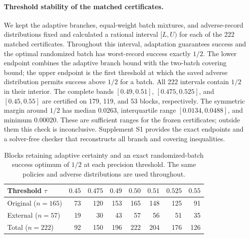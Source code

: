 \paragraph{Threshold stability of the matched certificates.}
We kept the adaptive branches, equal-weight batch mixtures, and adverse-record
distributions fixed and calculated a rational interval $[L,U)$ for each of
the 222 matched certificates. Throughout this interval, adaptation guarantees
success and the optimal randomized batch has worst-record success exactly
$1/2$. The lower endpoint combines the adaptive branch bound with
the two-batch covering bound; the upper endpoint is the first threshold at
which the saved adverse distribution permits success above $1/2$ for a batch.
All 222 intervals contain $1/2$ in their interior. The complete bands
$[0.49,0.51]$, $[0.475,0.525]$, and $[0.45,0.55]$ are certified on 179, 119,
and 53 blocks, respectively. The symmetric margin around $1/2$ has median
$0.0263$, interquartile range $[0.0134,0.0488]$, and minimum $0.00020$.
These are sufficient ranges for the frozen certificates; outside them this
check is inconclusive. Supplement S1 provides the exact endpoints and a
solver-free checker that reconstructs all branch and covering inequalities.

\begin{table}[htbp]
\centering
\small
\caption{Blocks retaining adaptive certainty and an exact randomized-batch
success optimum of $1/2$ at each precision threshold. The same policies and
adverse distributions are used throughout.}
\label{tab:threshold-stability}
\begin{tabular}{lrrrrrrr}
\toprule
Threshold $\tau$ & $0.45$ & $0.475$ & $0.49$ & $0.50$ & $0.51$ & $0.525$ & $0.55$\\
\midrule
Original ($n=165$) & 73 & 120 & 153 & 165 & 148 & 125 & 91\\
External ($n=57$) & 19 & 30 & 43 & 57 & 56 & 51 & 35\\
Total ($n=222$) & 92 & 150 & 196 & 222 & 204 & 176 & 126\\
\bottomrule
\end{tabular}
\end{table}
